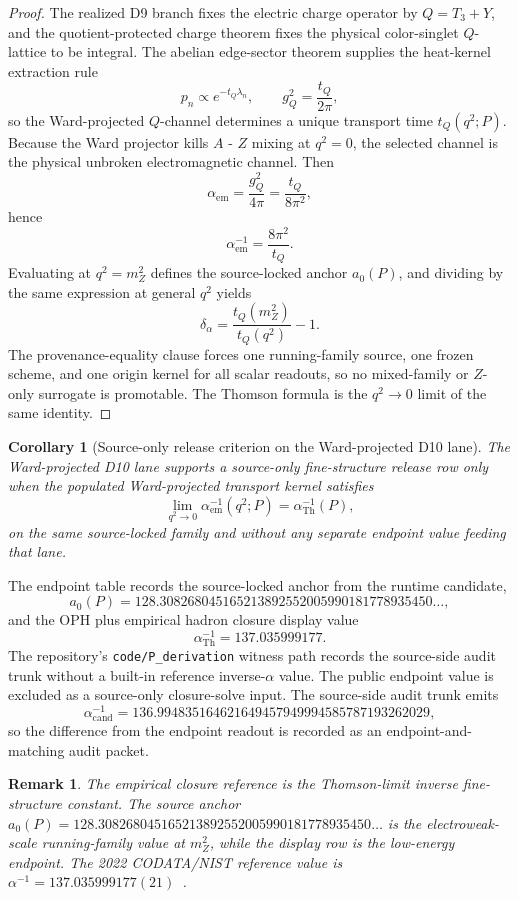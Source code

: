 \documentclass[11pt]{article}
\newtheorem{corollary}[theorem]{Corollary}
\newtheorem{remark}[theorem]{Remark}
\begin{document}
\begin{proof}
The realized D9 branch fixes the electric charge operator by \(Q=T_3+Y\), and the
quotient-protected charge theorem fixes the physical color-singlet \(Q\)-lattice to be integral.
The abelian edge-sector theorem supplies the heat-kernel extraction rule
\[
p_n\propto e^{-t_Q\lambda_n},
\qquad
g_Q^2=\frac{t_Q}{2\pi},
\]
so the Ward-projected \(Q\)-channel determines a unique transport time \(t_Q(q^2;P)\). Because
the Ward projector kills \(A\) - \(Z\) mixing at \(q^2=0\), the selected channel is the physical
unbroken electromagnetic channel. Then
\[
\alpha_{\mathrm{em}}=\frac{g_Q^2}{4\pi}=\frac{t_Q}{8\pi^2},
\]
hence
\[
\alpha_{\mathrm{em}}^{-1}=\frac{8\pi^2}{t_Q}.
\]
Evaluating at \(q^2=m_Z^2\) defines the source-locked anchor \(a_0(P)\), and dividing by the same
expression at general \(q^2\) yields
\[
\delta_\alpha=\frac{t_Q(m_Z^2)}{t_Q(q^2)}-1.
\]
The provenance-equality clause forces one running-family source, one frozen scheme, and one origin
kernel for all scalar readouts, so no mixed-family or \(Z\)-only surrogate is promotable. The
Thomson formula is the \(q^2\to0\) limit of the same identity.
\end{proof}

\begin{corollary}[Source-only release criterion on the Ward-projected D10 lane]
The Ward-projected D10 lane supports a source-only fine-structure release row only when the populated
Ward-projected transport kernel satisfies
\[
\lim_{q^2\to0}\alpha_{\mathrm{em}}^{-1}(q^2;P)=\alpha_{\mathrm{Th}}^{-1}(P),
\]
on the same source-locked family and without any separate endpoint value feeding that lane.
\end{corollary}

The endpoint table records the source-locked anchor from the runtime candidate,
\[
a_0(P)=128.308268045165213892552005990181778935450\ldots,
\]
and the OPH plus empirical hadron closure display value
\[
\alpha_{\mathrm{Th}}^{-1}=137.035999177.
\]
The repository's \texttt{code/P\_derivation} witness path records the source-side audit trunk without
a built-in reference inverse-\(\alpha\) value. The public endpoint value is excluded as a
source-only closure-solve input.
The source-side audit trunk emits
\[
\alpha_{\mathrm{cand}}^{-1}=136.994835164621649457949994585787193262029,
\]
so the difference from the endpoint readout is recorded as an endpoint-and-matching audit packet.

\begin{remark}
The empirical closure reference is the Thomson-limit inverse fine-structure constant. The
source anchor \(a_0(P)=128.308268045165213892552005990181778935450\ldots\) is the electroweak-scale running-family value at
\(m_Z^2\), while the display row is the low-energy endpoint. The 2022 CODATA/NIST reference value is
\(\alpha^{-1}=137.035999177(21)\)~\cite{codata2022}.
\end{remark}
\end{document}
